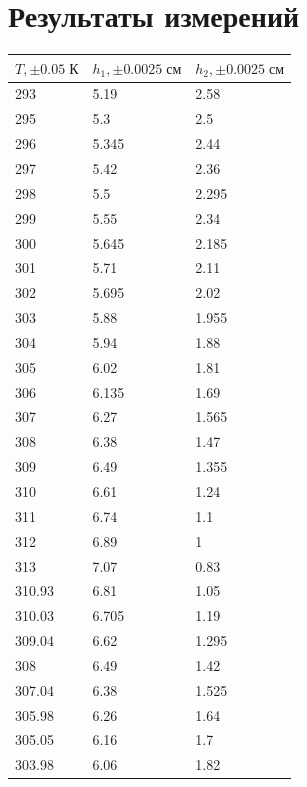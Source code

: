 \section{Результаты измерений}
\begin{table}[!ht]
    \centering
    \begin{tabular}{|l|l|l|}
    \hline
        $T,\pm 0.05\;\text{К}$ & $h_1,\pm 0.0025\;\text{см}$ & $h_2,\pm 0.0025\;\text{см}$ \\ \hline
        293 & 5.19 & 2.58 \\ \hline
        295 & 5.3 & 2.5 \\ \hline
        296 & 5.345 & 2.44 \\ \hline
        297 & 5.42 & 2.36 \\ \hline
        298 & 5.5 & 2.295 \\ \hline
        299 & 5.55 & 2.34 \\ \hline
        300 & 5.645 & 2.185 \\ \hline
        301 & 5.71 & 2.11 \\ \hline
        302 & 5.695 & 2.02 \\ \hline
        303 & 5.88 & 1.955 \\ \hline
        304 & 5.94 & 1.88 \\ \hline
        305 & 6.02 & 1.81 \\ \hline
        306 & 6.135 & 1.69 \\ \hline
        307 & 6.27 & 1.565 \\ \hline
        308 & 6.38 & 1.47 \\ \hline
        309 & 6.49 & 1.355 \\ \hline
        310 & 6.61 & 1.24 \\ \hline
        311 & 6.74 & 1.1 \\ \hline
        312 & 6.89 & 1 \\ \hline
        313 & 7.07 & 0.83 \\ \hline
        310.93 & 6.81 & 1.05 \\ \hline
        310.03 & 6.705 & 1.19 \\ \hline
        309.04 & 6.62 & 1.295 \\ \hline
        308 & 6.49 & 1.42 \\ \hline
        307.04 & 6.38 & 1.525 \\ \hline
        305.98 & 6.26 & 1.64 \\ \hline
        305.05 & 6.16 & 1.7 \\ \hline
        303.98 & 6.06 & 1.82 \\ \hline

\end{tabular}
\end{table}
